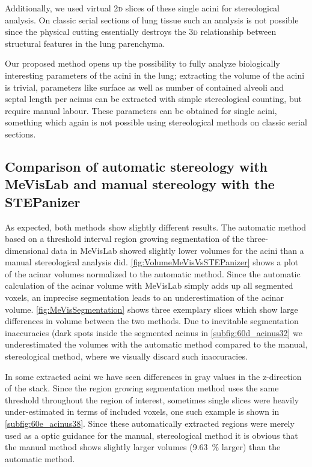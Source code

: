 \documentclass[%
	paper=a4,%
	abstract=true,%
	]{scrartcl}
\newcommand{\twod}{2\textsc{d}\xspace}
\newcommand{\threed}{3\textsc{d}\xspace}
\begin{document}
Additionally, we used virtual \twod slices of these single acini for stereological analysis. On classic serial sections of lung tissue such an analysis is not possible since the physical cutting essentially destroys the \threed relationship between structural features in the lung parenchyma.

Our proposed method opens up the possibility to fully analyze biologically interesting parameters of the acini in the lung; extracting the volume of the acini is trivial, parameters like surface as well as number of contained alveoli and septal length per acinus can be extracted with simple stereological counting, but require manual labour. These parameters can be obtained for single acini, something which again is not possible using stereological methods on classic serial sections.

\subsection[Comparison of MeVisLab with STEPanizer]{Comparison of automatic stereology with MeVisLab and manual stereology with the STEPanizer\label{subsec:MeVisVsSTEPanizer}}
As expected, both methods show slightly different results. The automatic method based on a threshold interval region growing segmentation of the three-dimensional data in MeVisLab showed slightly lower volumes for the acini than a manual stereological analysis did. \autoref{fig:VolumeMeVisVsSTEPanizer} shows a plot of the acinar volumes normalized to the automatic method. Since the automatic calculation of the acinar volume with MeVisLab simply adds up all segmented voxels, an imprecise segmentation leads to an underestimation of the acinar volume. \autoref{fig:MeVisSegmentation} shows three exemplary slices which show large differences in volume between the two methods. Due to inevitable segmentation inaccuracies (dark spots inside the segmented acinus in \autoref{subfig:60d_acinus32} we underestimated the volumes with the automatic method compared to the manual, stereological method, where we visually discard such inaccuracies.

In some extracted acini we have seen differences in gray values in the z-direction of the stack. Since the region growing segmentation method uses the same threshold throughout the region of interest, sometimes single slices were heavily under-estimated in terms of included voxels, one such example is shown in \autoref{subfig:60e_acinus38}. Since these automatically extracted regions were merely used as a optic guidance for the manual, stereological method it is obvious that the manual method shows slightly larger volumes (\SI{9.63}{\percent} larger) than the automatic method.
\end{document}
